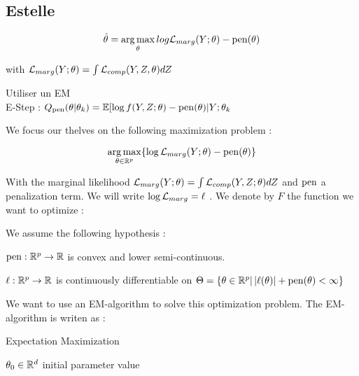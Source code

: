 \documentclass[a4paper]{article}
\renewcommand{\varobs}{Y}
\renewcommand{\logmarg}{\ell}
\begin{document}
 
\begin{myText}

\subsection{Estelle}

$$\hat \theta = \argmax_{\theta} log \Lmarg(\varobs;\theta) - \pen(\theta)$$

with $\Lmarg(Y;\theta) = \int \Lcomp(\varobs,\varlat,\theta) d\varlat$


\begin{myItemize}[violet]
    \item Utiliser un EM
    \\ E-Step : $Q_{\mathrm{pen}}(\theta|\theta_k) = \mathbb E[\log f(Y,Z;\theta) -\mathrm{pen}(\theta) | Y; \theta_k$
\end{myItemize}


\newpage 


We focus our thelves on the following maximization problem :

$$\argmax_{\theta \in \setr^p} \{ \log \Lmarg(\varobs ; \theta) - \pen(\theta)\}$$

With the marginal likelihood $\Lmarg(\varobs ; \theta) = \int \Lcomp(\varobs, \varlat ; \theta) d\varlat$ and  $\mathrm{pen}$ a penalization term. We will write $\log\Lmarg = \logmarg$ . We denote by $F$ the function we want to optimize : 

\begin{center}\shabox{$\argmax_{\theta \in \setr^p} F(\theta) = \argmax_{\theta \in \setr^p}\{\logmarg(\theta) - \pen(\theta) \}$}\end{center}

We assume the following hypothesis :
\begin{myItemize}[blue]
    \item $\mathrm{pen} : \mathbb R^p \rightarrow \mathbb R$ is convex and lower semi-continuous.
    \item $\logmarg : \setr^p \rightarrow \setr$ is continuously differentiable on $\Theta = \{ \theta\in\setr^p | \abs{\logmarg(\theta)} + \pen(\theta) < \infty\}$
\end{myItemize}

We want to use an EM-algorithm to solve this optimization problem. The EM-algorithm is writen as : 

\begin{myAlgorithm}[12cm]
    \caption{Expectation Maximization}
    \Initialize $\theta_0 \in \mathbb R^d$ initial parameter value
    

\end{myAlgorithm}
\end{myText}
\end{document}
